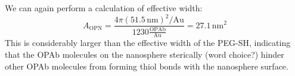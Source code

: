 We can again perform a calculation of effective width: \[A_{\mathrm{OPN}}=\frac{4\pi(51.5\mathrm{\,nm})^2/\mathrm{Au}}{1230\mathrm{\frac{OPAb}{Au}}}=27.1\,\mathrm{nm}^2\]
This is considerably larger than the effective width of the PEG-SH, indicating that the OPAb molecules on the nanosphere sterically (word choice?) hinder other OPAb molecules from forming thiol bonds with the nanosphere surface.
